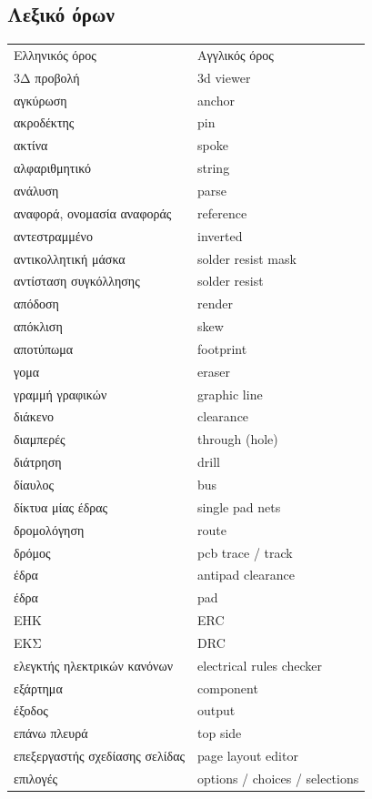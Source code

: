\documentclass[a4paper]{article}
\begin{document}
\subsection{Λεξικό όρων}
\begin{longtabu}{ l l }
    Ελληνικός όρος	&	Αγγλικός όρος	\\
    3Δ προβολή	&	3d viewer	\\
    αγκύρωση	&	anchor	\\
    ακροδέκτης	&	pin	\\
    ακτίνα	&	spoke	\\
    αλφαριθμητικό	&	string	\\
    ανάλυση	&	parse	\\
    αναφορά, ονομασία αναφοράς	&	reference	\\
    αντεστραμμένο	&	inverted	\\
    αντικολλητική μάσκα	&	solder resist mask	\\
    αντίσταση συγκόλλησης	&	solder resist	\\
    απόδοση	&	render	\\
    απόκλιση	&	skew	\\
    αποτύπωμα	&	footprint	\\
    γομα	&	eraser	\\
    γραμμή γραφικών	&	graphic line	\\
    διάκενο	&	clearance	\\
    διαμπερές	&	through (hole)	\\
    διάτρηση	&	drill	\\
    δίαυλος	&	bus	\\
    δίκτυα μίας έδρας	&	single pad nets	\\
    δρομολόγηση	&	route	\\
    δρόμος	&	pcb trace / track	\\
    έδρα	&	antipad clearance	\\
    έδρα	&	pad	\\
    ΕΗΚ	&	ERC	\\
    ΕΚΣ	&	DRC	\\
    ελεγκτής ηλεκτρικών κανόνων	&	electrical rules checker	\\
    εξάρτημα	&	component	\\
    έξοδος	&	output	\\
    επάνω πλευρά	&	top side	\\
    επεξεργαστής σχεδίασης σελίδας	&	page layout editor	\\
    επιλογές	&	options / choices / selections	\\

\end{longtabu}
\end{document}
